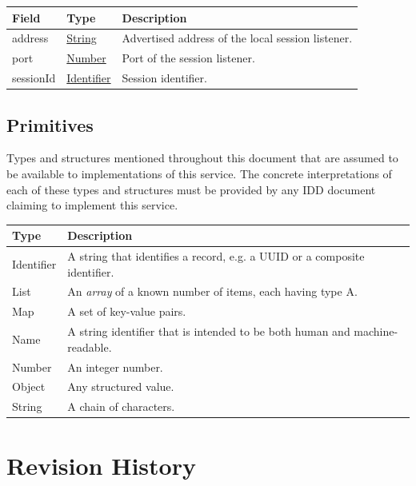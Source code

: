 \documentclass[a4paper]{arrowhead}
\newcommand{\pdef}[1]{{\textcolor{ArrowheadGrey}{#1\label{sec:model:primitives:#1}\label{sec:model:primitives:#1s}\label{sec:model:primitives:#1es}}}}
\newcommand{\pref}[1]{{\textcolor{ArrowheadGrey}{\hyperref[sec:model:primitives:#1]{#1}}}}
\begin{document}
\noindent\begin{tabularx}{\textwidth}{| >{\raggedright\arraybackslash}p{3.9cm} | >{\raggedright\arraybackslash\small}p{5.3cm} | X |} \hline
\rowcolor{gray!33} Field & Type & Description \\ \hline
address & \pref{String} & Advertised address of the local session listener. \\ \hline
port & \pref{Number} & Port of the session listener. \\ \hline
session\allowbreak{}Id & \pref{Identifier} & Session identifier. \\ \hline
\end{tabularx}



\subsection{Primitives}
\label{sec:model:primitives}

Types and structures mentioned throughout this document that are assumed to be available to implementations of this service.
The concrete interpretations of each of these types and structures must be provided by any IDD document claiming to implement this service.

\noindent\begin{tabularx}{\textwidth}{| p{4.6cm} | X |} \hline
\rowcolor{gray!33} Type & Description \\ \hline
\pdef{Identifier} & A string that identifies a record, e.g. a UUID or a composite identifier. \\ \hline
\pdef{List} & An \textit{array} of a known number of items, each having type A. \\ \hline
\pdef{Map} & A set of key-value pairs. \\ \hline
\pdef{Name} & A string identifier that is intended to be both human and machine-readable. \\ \hline
\pdef{Number} & An integer number. \\ \hline
\pdef{Object} & Any structured value. \\ \hline
\pdef{String} & A chain of characters. \\ \hline
\end{tabularx}

\newpage




\newpage

\section{Revision History}
\end{document}
